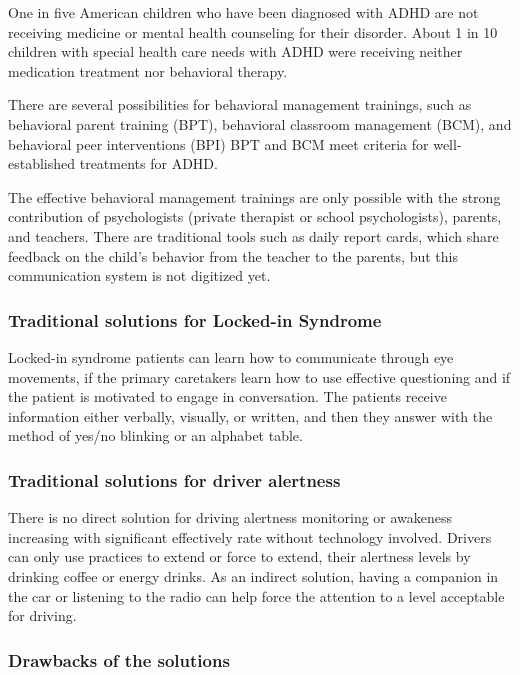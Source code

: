 \documentclass[letterpaper,10pt]{article}
\begin{document}
One in five American children who have been diagnosed with ADHD are not receiving medicine or mental health counseling for their disorder. \cite{healthline_adhd}
About 1 in 10 children with special health care needs with ADHD were receiving neither medication treatment nor behavioral therapy. \cite{adhd_general}

There are several possibilities for behavioral management trainings, such as behavioral parent training (BPT), behavioral classroom management (BCM), and behavioral peer interventions (BPI) BPT and BCM meet criteria for well-established treatments for ADHD. \cite{pelham_fabiano_2008}

The effective behavioral management trainings are only possible with the strong contribution of psychologists (private therapist or school psychologists), parents, and teachers. There are traditional tools such as daily report cards, which share feedback on the child's behavior from the teacher to the parents, but this communication system is not digitized yet.

\subsubsection{Traditional solutions for Locked-in Syndrome}

Locked-in syndrome patients can learn how to communicate through eye movements, if the primary caretakers learn how to use  effective questioning and if the patient is motivated to engage in  conversation. The patients receive information either verbally, visually, or written, and then they answer with the method of yes/no blinking or an alphabet table. \cite{locked_laureys}

\subsubsection{Traditional solutions for driver alertness}

There is no direct solution for driving alertness monitoring or awakeness increasing with significant effectively rate without technology involved. Drivers can only use practices to extend  or force to extend, their alertness levels by drinking coffee or energy drinks. As an indirect solution, having a companion in the car or listening to the radio can help force the attention to a level acceptable for driving.


\subsubsection{Drawbacks of the solutions}
\end{document}
